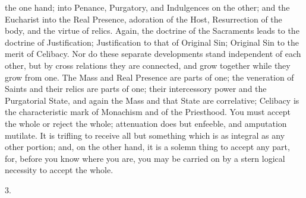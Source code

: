 the one hand; into Penance, Purgatory, and Indulgences on
the other; and the Eucharist into the Real Presence,
adoration of the Host, Resurrection of the body, and the
virtue of relics. Again, the doctrine of the Sacraments
leads to the doctrine of Justification; Justification to
that of Original Sin; Original Sin to the merit of
Celibacy. Nor do these separate developments stand
independent of each other, but by cross relations they
are connected, and grow together while they grow from
one. The Mass and Real Presence are parts of one; the
veneration of Saints and their relics are parts of one;
their intercessory power and the Purgatorial State, and
again the Mass and that State are correlative; Celibacy
is the characteristic mark of Monachism and of the
Priesthood. You must accept the whole or reject the
whole; attenuation does but enfeeble, and amputation
mutilate. It is trifling to receive all but something
which is as integral as any other portion; and, on the
other hand, it is a solemn thing to accept any part, for,
before you know where you are, you may be carried on by a
stern logical necessity to accept the whole.

3.

